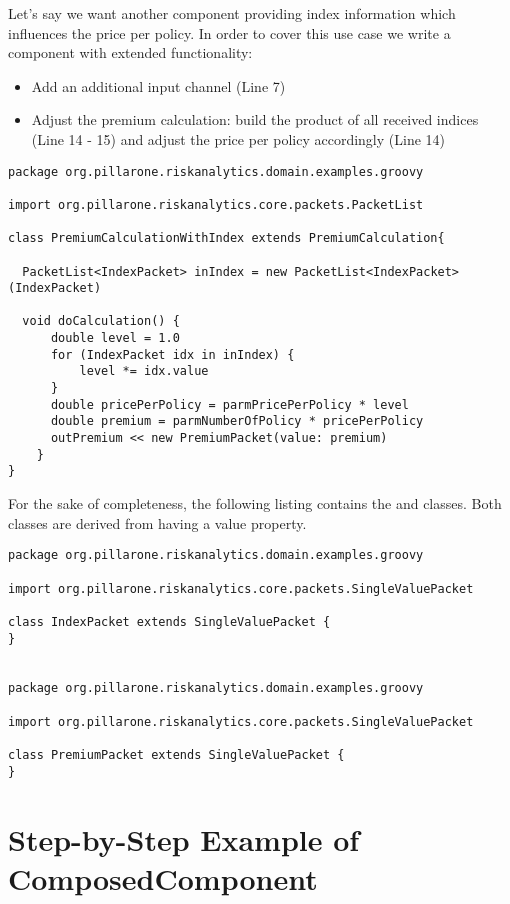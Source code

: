 Let's say we want another component providing index information which influences the price per policy. In order to cover this use case we write a component with extended functionality:

\begin{itemize}
  \item Add an additional input channel  (Line 7)
  \item Adjust the premium calculation: build the product of all received indices (Line 14 - 15) and adjust the price per policy accordingly (Line 14)
\end{itemize}


\begin{lstlisting}[label=lst:premcalwi]
package org.pillarone.riskanalytics.domain.examples.groovy

import org.pillarone.riskanalytics.core.packets.PacketList

class PremiumCalculationWithIndex extends PremiumCalculation{

  PacketList<IndexPacket> inIndex = new PacketList<IndexPacket>(IndexPacket)

  void doCalculation() {
      double level = 1.0
      for (IndexPacket idx in inIndex) {
          level *= idx.value
      }
      double pricePerPolicy = parmPricePerPolicy * level
      double premium = parmNumberOfPolicy * pricePerPolicy
      outPremium << new PremiumPacket(value: premium)
    }
}\end{lstlisting}

For the sake of completeness, the following listing contains the  and  classes. Both classes are derived from  having a value property.
\begin{lstlisting}[label=lst:premindex]
package org.pillarone.riskanalytics.domain.examples.groovy

import org.pillarone.riskanalytics.core.packets.SingleValuePacket

class IndexPacket extends SingleValuePacket {
}


package org.pillarone.riskanalytics.domain.examples.groovy

import org.pillarone.riskanalytics.core.packets.SingleValuePacket

class PremiumPacket extends SingleValuePacket {
}
\end{lstlisting}



\section{Step-by-Step Example of ComposedComponent}

